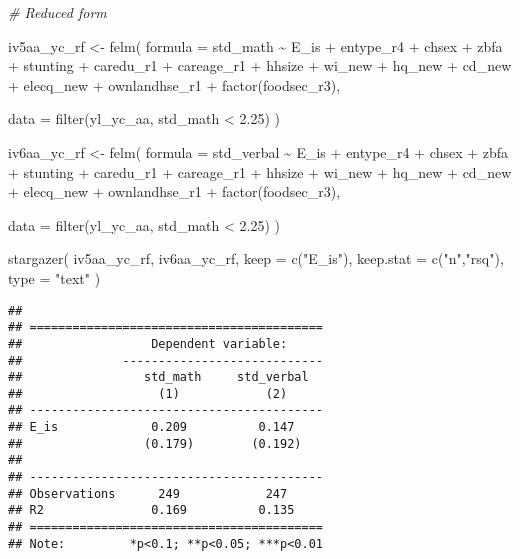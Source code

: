 \documentclass[
]{article}
\newenvironment{Shaded}{\begin{snugshade}}{\end{snugshade}}
\newcommand{\AttributeTok}[1]{\textcolor[rgb]{0.77,0.63,0.00}{#1}}
\newcommand{\CommentTok}[1]{\textcolor[rgb]{0.56,0.35,0.01}{\textit{#1}}}
\newcommand{\FloatTok}[1]{\textcolor[rgb]{0.00,0.00,0.81}{#1}}
\newcommand{\FunctionTok}[1]{\textcolor[rgb]{0.00,0.00,0.00}{#1}}
\newcommand{\NormalTok}[1]{#1}
\newcommand{\OtherTok}[1]{\textcolor[rgb]{0.56,0.35,0.01}{#1}}
\newcommand{\SpecialCharTok}[1]{\textcolor[rgb]{0.00,0.00,0.00}{#1}}
\newcommand{\StringTok}[1]{\textcolor[rgb]{0.31,0.60,0.02}{#1}}
\begin{document}
\begin{Shaded}
\begin{Highlighting}[]
\CommentTok{\# Reduced form}

\NormalTok{iv5aa\_yc\_rf }\OtherTok{\textless{}{-}} \FunctionTok{felm}\NormalTok{(}
  \AttributeTok{formula =}\NormalTok{ std\_math }\SpecialCharTok{\textasciitilde{}}\NormalTok{ E\_is }\SpecialCharTok{+}\NormalTok{ entype\_r4 }\SpecialCharTok{+}\NormalTok{ chsex }\SpecialCharTok{+}\NormalTok{ zbfa }\SpecialCharTok{+}\NormalTok{ stunting }\SpecialCharTok{+}\NormalTok{ caredu\_r1 }\SpecialCharTok{+} 
\NormalTok{    careage\_r1 }\SpecialCharTok{+}\NormalTok{ hhsize }\SpecialCharTok{+}\NormalTok{ wi\_new }\SpecialCharTok{+}\NormalTok{ hq\_new }\SpecialCharTok{+}  
\NormalTok{    cd\_new }\SpecialCharTok{+}\NormalTok{ elecq\_new }\SpecialCharTok{+}\NormalTok{ ownlandhse\_r1 }\SpecialCharTok{+} \FunctionTok{factor}\NormalTok{(foodsec\_r3), }
  
  \AttributeTok{data =} \FunctionTok{filter}\NormalTok{(yl\_yc\_aa, std\_math }\SpecialCharTok{\textless{}} \FloatTok{2.25}\NormalTok{)}
\NormalTok{)}

\NormalTok{iv6aa\_yc\_rf }\OtherTok{\textless{}{-}} \FunctionTok{felm}\NormalTok{(}
  \AttributeTok{formula =}\NormalTok{ std\_verbal }\SpecialCharTok{\textasciitilde{}}\NormalTok{ E\_is }\SpecialCharTok{+}\NormalTok{ entype\_r4 }\SpecialCharTok{+}\NormalTok{ chsex }\SpecialCharTok{+}\NormalTok{ zbfa }\SpecialCharTok{+}\NormalTok{ stunting }\SpecialCharTok{+}\NormalTok{ caredu\_r1 }\SpecialCharTok{+} 
\NormalTok{    careage\_r1 }\SpecialCharTok{+}\NormalTok{ hhsize }\SpecialCharTok{+}\NormalTok{ wi\_new }\SpecialCharTok{+}\NormalTok{ hq\_new }\SpecialCharTok{+}  
\NormalTok{    cd\_new }\SpecialCharTok{+}\NormalTok{ elecq\_new }\SpecialCharTok{+}\NormalTok{ ownlandhse\_r1 }\SpecialCharTok{+} \FunctionTok{factor}\NormalTok{(foodsec\_r3), }
  
  \AttributeTok{data =} \FunctionTok{filter}\NormalTok{(yl\_yc\_aa, std\_math }\SpecialCharTok{\textless{}} \FloatTok{2.25}\NormalTok{)}
\NormalTok{)}

\FunctionTok{stargazer}\NormalTok{(}
\NormalTok{  iv5aa\_yc\_rf, iv6aa\_yc\_rf,}
  \AttributeTok{keep =} \FunctionTok{c}\NormalTok{(}\StringTok{"E\_is"}\NormalTok{),}
  \AttributeTok{keep.stat =} \FunctionTok{c}\NormalTok{(}\StringTok{"n"}\NormalTok{,}\StringTok{"rsq"}\NormalTok{),}
  \AttributeTok{type =} \StringTok{"text"}
\NormalTok{)}
\end{Highlighting}
\end{Shaded}

\begin{verbatim}
## 
## =========================================
##                  Dependent variable:     
##              ----------------------------
##                 std_math     std_verbal  
##                   (1)            (2)     
## -----------------------------------------
## E_is             0.209          0.147    
##                 (0.179)        (0.192)   
##                                          
## -----------------------------------------
## Observations      249            247     
## R2               0.169          0.135    
## =========================================
## Note:         *p<0.1; **p<0.05; ***p<0.01
\end{verbatim}
\end{document}
